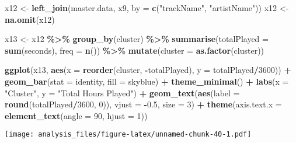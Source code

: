 \documentclass[
]{article}
\newenvironment{Shaded}{\begin{snugshade}}{\end{snugshade}}
\newcommand{\AttributeTok}[1]{\textcolor[rgb]{0.13,0.29,0.53}{#1}}
\newcommand{\DecValTok}[1]{\textcolor[rgb]{0.00,0.00,0.81}{#1}}
\newcommand{\FloatTok}[1]{\textcolor[rgb]{0.00,0.00,0.81}{#1}}
\newcommand{\FunctionTok}[1]{\textcolor[rgb]{0.13,0.29,0.53}{\textbf{#1}}}
\newcommand{\NormalTok}[1]{#1}
\newcommand{\OtherTok}[1]{\textcolor[rgb]{0.56,0.35,0.01}{#1}}
\newcommand{\SpecialCharTok}[1]{\textcolor[rgb]{0.81,0.36,0.00}{\textbf{#1}}}
\newcommand{\StringTok}[1]{\textcolor[rgb]{0.31,0.60,0.02}{#1}}
\begin{document}
\begin{Shaded}
\begin{Highlighting}[]
\NormalTok{x12 }\OtherTok{\textless{}{-}} \FunctionTok{left\_join}\NormalTok{(master.data, x9, }\AttributeTok{by =} \FunctionTok{c}\NormalTok{(}\StringTok{"trackName"}\NormalTok{, }\StringTok{"artistName"}\NormalTok{))}
\NormalTok{x12 }\OtherTok{\textless{}{-}} \FunctionTok{na.omit}\NormalTok{(x12)}

\NormalTok{x13 }\OtherTok{\textless{}{-}}\NormalTok{ x12 }\SpecialCharTok{\%\textgreater{}\%}
  \FunctionTok{group\_by}\NormalTok{(cluster) }\SpecialCharTok{\%\textgreater{}\%}
  \FunctionTok{summarise}\NormalTok{(}\AttributeTok{totalPlayed =} \FunctionTok{sum}\NormalTok{(seconds), }\AttributeTok{freq =} \FunctionTok{n}\NormalTok{()) }\SpecialCharTok{\%\textgreater{}\%}
  \FunctionTok{mutate}\NormalTok{(}\AttributeTok{cluster =} \FunctionTok{as.factor}\NormalTok{(cluster))}

\FunctionTok{ggplot}\NormalTok{(x13, }\FunctionTok{aes}\NormalTok{(}\AttributeTok{x =} \FunctionTok{reorder}\NormalTok{(cluster, }\SpecialCharTok{{-}}\NormalTok{totalPlayed), }\AttributeTok{y =}\NormalTok{ totalPlayed}\SpecialCharTok{/}\DecValTok{3600}\NormalTok{)) }\SpecialCharTok{+} \FunctionTok{geom\_bar}\NormalTok{(}\AttributeTok{stat =} \StringTok{\textquotesingle{}identity\textquotesingle{}}\NormalTok{, }\AttributeTok{fill =} \StringTok{\textquotesingle{}skyblue\textquotesingle{}}\NormalTok{) }\SpecialCharTok{+} \FunctionTok{theme\_minimal}\NormalTok{() }\SpecialCharTok{+} \FunctionTok{labs}\NormalTok{(}\AttributeTok{x =} \StringTok{"Cluster"}\NormalTok{, }\AttributeTok{y =} \StringTok{"Total Hours Played"}\NormalTok{) }\SpecialCharTok{+} \FunctionTok{geom\_text}\NormalTok{(}\FunctionTok{aes}\NormalTok{(}\AttributeTok{label =} \FunctionTok{round}\NormalTok{(totalPlayed}\SpecialCharTok{/}\DecValTok{3600}\NormalTok{, }\DecValTok{0}\NormalTok{)), }\AttributeTok{vjust =} \SpecialCharTok{{-}}\FloatTok{0.5}\NormalTok{, }\AttributeTok{size =} \DecValTok{3}\NormalTok{) }\SpecialCharTok{+} \FunctionTok{theme}\NormalTok{(}\AttributeTok{axis.text.x =} \FunctionTok{element\_text}\NormalTok{(}\AttributeTok{angle =} \DecValTok{90}\NormalTok{, }\AttributeTok{hjust =} \DecValTok{1}\NormalTok{))}
\end{Highlighting}
\end{Shaded}

\texttt{[image: analysis\_files/figure-latex/unnamed-chunk-40-1.pdf]}
\end{document}
